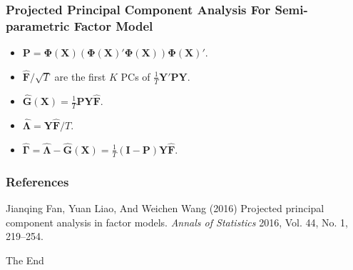 \documentclass{beamer}
\newcommand{\bF}{\mathbf F}
\newcommand{\bG}{\mathbf G}
\newcommand{\bI}{\mathbf I}
\newcommand{\bP}{\mathbf P}
\newcommand{\bX}{\mathbf X}
\newcommand{\bY}{\mathbf Y}
\newcommand{\bLambda}{\boldsymbol{\Lambda}}
\newcommand{\bGamma}{\boldsymbol{\Gamma}}
\newcommand{\bPhi}{\boldsymbol{\Phi}}
\begin{document}

\begin{frame}
\frametitle{Projected Principal Component Analysis For Semi-parametric Factor Model}
\begin{itemize}
	\item $\bP = \bPhi(\bX)(\bPhi(\bX)'\bPhi(\bX))\bPhi(\bX)' $.
	\item $\hat{\bF}/\sqrt{T}$ are the first $K$ PCs of $\frac{1}{T} \bY' \bP \bY$.
	\item $\hat{\bG}(\bX) = \frac{1}{T} \bP \bY \hat{\bF}$.
	\item $\hat{\bLambda} = \bY\hat{\bF}/T$.
	\item $\hat{\bGamma} = \hat{\bLambda} - \hat{\bG}(\bX) = \frac{1}{T} (\bI - \bP) \bY \hat{\bF}$.
\end{itemize}
	
\end{frame}


\begin{frame}
\frametitle{References}
\footnotesize{
\begin{thebibliography}{99} %
 Jianqing Fan, Yuan Liao, And Weichen Wang (2016)
\newblock Projected principal component analysis in factor models.
\newblock \emph{ Annals of Statistics} 2016, Vol. 44, No. 1, 219–254.
\end{thebibliography}
}
\end{frame}


\begin{frame}
\Huge{\centerline{The End}}
\end{frame}

\end{document}
